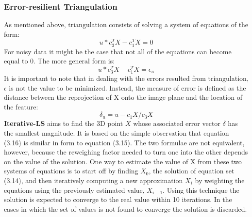 \documentclass[12pt,a4paper,twoside,openright]{report}
\begin{document}
\subsubsection{Error-resilient Triangulation}
As mentioned above, triangulation consists of solving a system of equations of the form:\\
\begin{equation}
u * {c}_{3}^TX - {c}_{1}^TX=0
\end{equation}
For noisy data it might be the case that not all of the equations can become equal to 0. The more general form is:
\begin{equation}
u * {c}_{3}^TX - {c}_{1}^TX=\epsilon_u
\end{equation}
It is important to note that in dealing with the errors resulted from triangulation, $\epsilon$ is not the value to be minimized. Instead, the measure of error is defined as the distance between the reprojection of X onto the image plane and the location of the feature: 
\begin{equation}
\delta_u = u - c_1X/c_3X
\end{equation}
\textbf{Iterative-LS}\cite[p.~9]{Hartley96triangulation} aims to  find the 3D point $X$ whose associated error vector $\delta$ has the smallest magnitude. It is based on the simple observation that equation (3.16) is similar in form to equation (3.15). The two formulae are not equivalent, however, because the reweighing factor needed to turn one into the other depends on the value of the solution. One way to estimate the value of X from these two systems of equations is to start off by finding $X_0$, the solution of equation set (3.14), and then iteratively computing a new approximation $X_i$  by weighting the equations using the previously estimated value, $X_{i-1}$. Using this technique the solution is expected to converge to the real value within 10 iterations. In the cases in which the set of values is not found to converge the solution is discarded.

 
\end{document}
